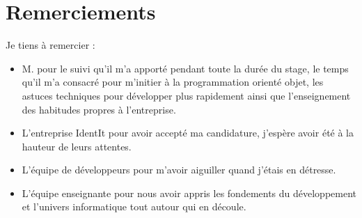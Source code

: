 \chapter*{Remerciements} %
\label{cha:Remerciements}

Je tiens à remercier :
\begin{itemize}
\item M. pour le suivi qu'il m'a apporté pendant toute la durée du
stage, le temps qu'il m'a consacré pour m'initier à la programmation orienté
objet, les astuces techniques pour développer plus rapidement ainsi que
l'enseignement des habitudes propres à l'entreprise.
\item L'entreprise IdentIt pour avoir accepté ma candidature, j'espère avoir
été à la hauteur de leurs attentes.
\item L'équipe de développeurs pour m'avoir aiguiller quand j'étais en
détresse.
\item L'équipe enseignante pour nous avoir appris les fondements du
développement et l'univers informatique tout autour qui en découle.
\end{itemize}
